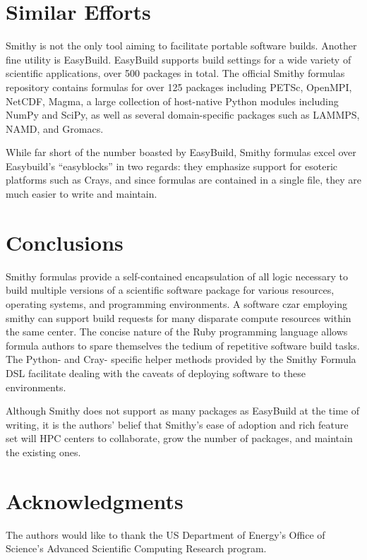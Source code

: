 \documentclass{acm_proc_article-sp}
\begin{document}
\section{Similar Efforts}

Smithy is not the only tool aiming to facilitate portable software builds.
Another fine utility is EasyBuild\cite{EasyBuild}. EasyBuild supports build
settings for a wide variety of scientific applications, over 500 packages in
total. The official Smithy formulas repository contains formulas for over 125
packages including PETSc, OpenMPI, NetCDF, Magma, a large collection of
host-native Python modules including NumPy and SciPy, as well as several
domain-specific packages such as LAMMPS, NAMD, and Gromacs.

While far short of the number boasted by EasyBuild, Smithy formulas excel over
Easybuild's ``easyblocks'' in two regards: they emphasize support for esoteric
platforms such as Crays, and since formulas are contained in a single file, they
are much easier to write and maintain.

\section{Conclusions}

Smithy formulas provide a self-contained encapsulation of all logic necessary to
build multiple versions of a scientific software package for various resources,
operating systems, and programming environments. A software czar employing
smithy can support build requests for many disparate compute resources within
the same center. The concise nature of the Ruby programming language allows
formula authors to spare themselves the tedium of repetitive software build
tasks. The Python- and Cray- specific helper methods provided by the Smithy
Formula DSL facilitate dealing with the caveats of deploying software to these
environments.

Although Smithy does not support as many packages as EasyBuild at the time of
writing, it is the authors' belief that Smithy's ease of adoption and rich
feature set will HPC centers to collaborate, grow the number of packages, and
maintain the existing ones.

\section{Acknowledgments}

The authors would like to thank the US Department of Energy's Office of
Science's Advanced Scientific Computing Research program.







\end{document}

